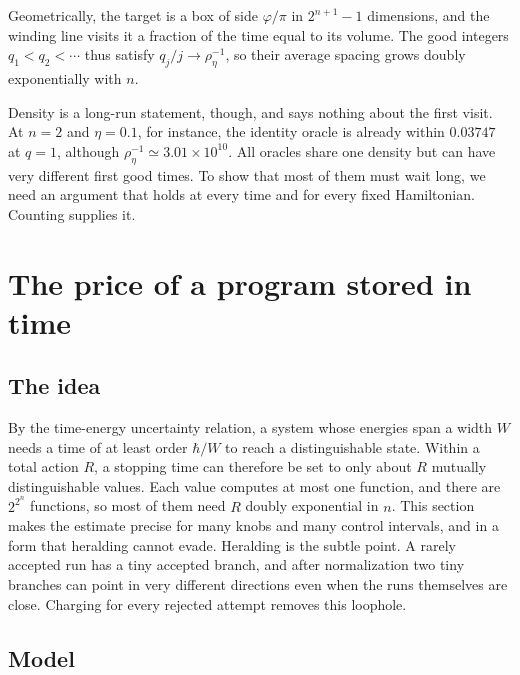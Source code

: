\documentclass[11pt,a4paper]{article}
\begin{document}
Geometrically, the target is a box of side $\varphi/\pi$ in $2^{n+1}-1$ dimensions, and the winding line visits it a fraction of the time equal to its volume. The good integers $q_1<q_2<\cdots$ thus satisfy $q_j/j\to\rho_\eta^{-1}$, so their average spacing grows doubly exponentially with $n$.

Density is a long-run statement, though, and says nothing about the first visit. At $n=2$ and $\eta=0.1$, for instance, the identity oracle is already within $0.03747$ at $q=1$, although $\rho_\eta^{-1}\simeq3.01\times10^{10}$. All oracles share one density but can have very different first good times. To show that most of them must wait long, we need an argument that holds at every time and for every fixed Hamiltonian. Counting supplies it.

\section{The price of a program stored in time}
\label{sec:capacity}

\subsection{The idea}

By the time-energy uncertainty relation, a system whose energies span a width $W$ needs a time of at least order $\hbar/W$ to reach a distinguishable state. Within a total action $R$, a stopping time can therefore be set to only about $R$ mutually distinguishable values. Each value computes at most one function, and there are $2^{2^n}$ functions, so most of them need $R$ doubly exponential in $n$. This section makes the estimate precise for many knobs and many control intervals, and in a form that heralding cannot evade. Heralding is the subtle point. A rarely accepted run has a tiny accepted branch, and after normalization two tiny branches can point in very different directions even when the runs themselves are close. Charging for every rejected attempt removes this loophole.

\subsection{Model}
\end{document}
